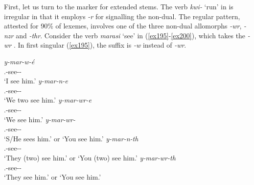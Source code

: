 First, let us turn to the  marker for extended stems. The verb \emph{kwi-} `run' in  is irregular in that it employs \emph{-r} for signalling the non-dual. The regular pattern, attested for 90\% of  lexemes, involves one of the three non-dual allomorphs \emph{-wr}, \emph{-nzr} and \emph{-thr}. Consider the verb \emph{marasi} `see' in (\ref{ex195}-\ref{ex200}), which takes the \emph{-wr} . In first  singular (\ref{ex195}), the  suffix is \emph{-w} instead of \emph{-wr}.

\begin{exe}
\ex \label{ex204}
\begin{xlist}
	\ex
	\gll \emph{y-mar-w-é}\\
	\Tsg.\Masc-see-\Ndu-\Fsg\\
	\trans `I see him.'
	\label{ex195}
	\ex
	\gll \emph{y-mar-n-e}\\
	\Tsg.\Masc-see-\Du-\Fnsg\\
	\trans `We two see him.'
	\label{ex196}
	\ex
	\gll \emph{y-mar-wr-e}\\
	\Tsg.\Masc-see-\Ndu-\Fnsg\\
	\trans `We see him.'
	\label{ex197}
	\ex
	\gll \emph{y-mar-wr-\Zero}\\
	\Tsg.\Masc-see-\Ndu-\Stsg\\
	\trans `S/He sees him.' or `You see him.'
	\label{ex198}
	\ex
	\gll \emph{y-mar-n-th}\\
	\Tsg.\Masc-see-\Du-\Stsg\\
	\trans `They (two) see him.' or `You (two) see him.'
	\label{ex199}
	\ex
	\gll \emph{y-mar-wr-th}\\
	\Tsg.\Masc-see-\Ndu-\Stnsg\\
	\trans `They see him.' or `You see him.'
	\label{ex200}
\end{xlist}
\end{exe}

